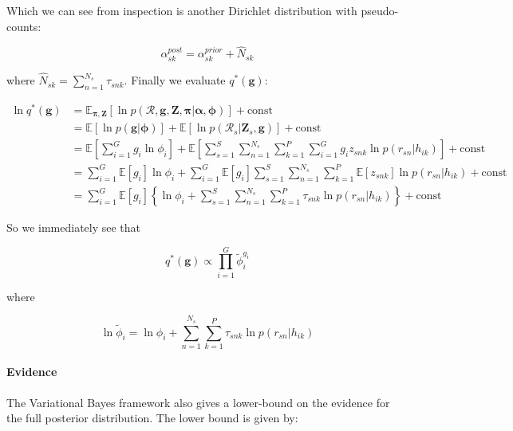 \documentclass{article}
\begin{document}
Which we can see from inspection is another Dirichlet distribution with pseudo-counts:

\begin{equation}
\label{eq:cnv_new_counts}
\alpha_{sk}^{post} = \alpha_{sk}^{prior} + \hat{N}_{sk}
\end{equation}

where $\hat{N}_{sk} = \sum_{n = 1}^{N_s} \tau_{snk}$. Finally we evaluate $q^*(\boldsymbol{g})$:

\begin{align}
\label{eq:cnv_ln_q_g}
\ln q^*(\boldsymbol{g}) &= \mathbb{E}_{\boldsymbol{\pi}, \boldsymbol{Z}} [\ln p(\mathcal{R}, \boldsymbol{g}, \boldsymbol{Z}, \boldsymbol{\pi} | \boldsymbol{\alpha}, \boldsymbol{\phi})] + \text{const} \\
&= \mathbb{E}[\ln p(\boldsymbol{g} | \boldsymbol{\phi})] + \mathbb{E}[\ln p(\mathcal{R}_s | \boldsymbol{Z}_s, \boldsymbol{g})] + \text{const} \\
&= \mathbb{E} \left [\sum_{i = 1}^G g_i \ln \phi_i \right] + \mathbb{E} \left[ \sum_{s = 1}^S \sum_{n = 1}^{N_s} \sum_{k = 1}^P \sum_{i = 1}^G g_i z_{snk} \ln p(r_{sn} | h_{ik}) \right] + \text{const} \\
&= \sum_{i = 1}^G \mathbb{E}[g_i] \ln \phi_i +  \sum_{i = 1}^G \mathbb{E}[g_i] \sum_{s = 1}^S \sum_{n = 1}^{N_s} \sum_{k = 1}^P \mathbb{E}[z_{snk}] \ln p(r_{sn} | h_{ik}) + \text{const} \\
&= \sum_{i = 1}^G \mathbb{E}[g_i] \left\{ \ln \phi_i + \sum_{s = 1}^S \sum_{n = 1}^{N_s} \sum_{k = 1}^P \tau_{snk} \ln p(r_{sn} | h_{ik}) \right\} + \text{const}
\end{align}

So we immediately see that

\begin{equation}
\label{eq:cnv_q_g}
q^*(\boldsymbol{g}) \propto \prod_{i = 1}^G \tilde{\phi}_i^{g_i}
\end{equation}

where

\begin{equation}
\label{eq:cnv_theta}
\ln \tilde{\phi}_i = \ln \phi_i + \sum_{n = 1}^{N_s} \sum_{k = 1}^P \tau_{snk} \ln p(r_{sn} | h_{ik})
\end{equation}

\paragraph{Evidence}

The Variational Bayes framework also gives a lower-bound on the evidence for the full posterior distribution. The lower bound is given by:
\end{document}
